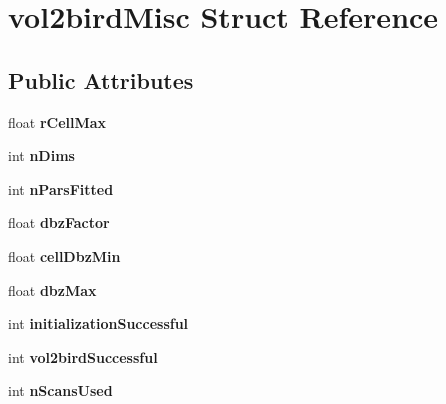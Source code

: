\hypertarget{structvol2birdMisc}{}\section{vol2bird\+Misc Struct Reference}
\label{structvol2birdMisc}
\subsection*{Public Attributes}
\begin{DoxyCompactItemize}
\item 
\mbox{\label{structvol2birdMisc_a762352b4f69031e476d553f608f66abf}} 
float {\bfseries r\+Cell\+Max}
\item 
\mbox{\label{structvol2birdMisc_a5646c2ceb617a10802cc324616526bf0}} 
int {\bfseries n\+Dims}
\item 
\mbox{\label{structvol2birdMisc_aaa2890caba9197ea437124cacf91b0c8}} 
int {\bfseries n\+Pars\+Fitted}
\item 
\mbox{\label{structvol2birdMisc_afd80c465c1eb0df24702eea9443141fc}} 
float {\bfseries dbz\+Factor}
\item 
\mbox{\label{structvol2birdMisc_a98faca3f5405ffa6196ca99e0e9c75e6}} 
float {\bfseries cell\+Dbz\+Min}
\item 
\mbox{\label{structvol2birdMisc_ae9fe9eeac066585274a1d1f0f714a18a}} 
float {\bfseries dbz\+Max}
\item 
\mbox{\label{structvol2birdMisc_a09e641d145c3964d32ebfbbb4404155d}} 
int {\bfseries initialization\+Successful}
\item 
\mbox{\label{structvol2birdMisc_a69ebf6fcb1d0f074033dd0bb8db162aa}} 
int {\bfseries vol2bird\+Successful}
\item 
\mbox{\label{structvol2birdMisc_a4623ada25a98de5452c28d2488b9afeb}} 
int {\bfseries n\+Scans\+Used}
\item 
\mbox{\label{structvol2birdMisc_ad6a7883360e8fd0bbd6322063b3be857}} 

\end{DoxyCompactItemize}
